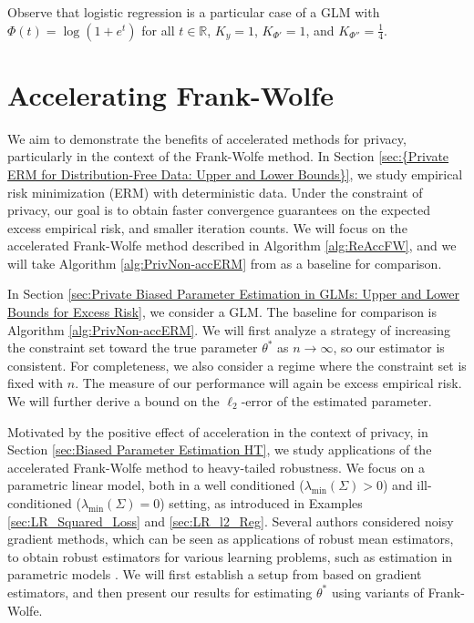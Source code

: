 \documentclass{article}
\begin{document}
Observe that logistic regression is a particular case of a GLM with $\Phi(t) = \log(1 + e^t)$ for all $t \in \mathbb{R}$, $K_y = 1$, $K_{\Phi'} = 1$, and $K_{\Phi''} = \frac{1}{4}$.


\section{Accelerating Frank-Wolfe}
\label{sec:Acc_FW_Method_All}

We aim to demonstrate the benefits of accelerated methods for privacy, particularly in the context of the Frank-Wolfe method. In Section \ref{sec:{Private ERM for Distribution-Free Data: Upper and Lower Bounds}}, we study empirical risk minimization (ERM) with deterministic data. Under the constraint of privacy, our goal is to obtain faster convergence guarantees on the expected excess empirical risk, and smaller iteration counts. We will focus on the accelerated Frank-Wolfe method described in Algorithm \ref{alg:ReAccFW}, and we will take Algorithm \ref{alg:PrivNon-accERM} from \cite{NOPL} as a baseline for comparison.

In Section \ref{sec:Private Biased Parameter Estimation in GLMs: Upper and Lower Bounds for Excess Risk}, we consider a GLM. The baseline for comparison is Algorithm \ref{alg:PrivNon-accERM}. We will first analyze a strategy of increasing the constraint set toward the true parameter $\theta^*$ as $n \rightarrow \infty$, so our estimator is consistent. For completeness, we also consider a regime where the constraint set is fixed with $n$. The measure of our performance will  again be excess empirical risk. We will further derive a bound on the $\ell_2$-error of the estimated parameter.

Motivated by the positive effect of acceleration in the context of privacy, in Section \ref{sec:Biased Parameter Estimation HT}, we study applications of the accelerated Frank-Wolfe method to heavy-tailed robustness. We focus on a parametric linear model, both in a well conditioned ($\lambda_{\min}(\Sigma) > 0$) and ill-conditioned ($\lambda_{\min}(\Sigma) = 0$) setting, as introduced in Examples \ref{sec:LR_Squared_Loss} and \ref{sec:LR_l2_Reg}. Several authors \cite{RE, CompIntr, Balakrish} considered noisy gradient methods, which can be seen as applications of robust mean estimators, to obtain robust estimators for various learning problems, such as estimation in parametric models \cite{DP_ROB_HIGH_DIM, NO_ROB_LR}. We will first establish a setup from \cite{RE} based on gradient estimators, and then present our results for estimating $\theta^*$ using variants of Frank-Wolfe.
\end{document}
